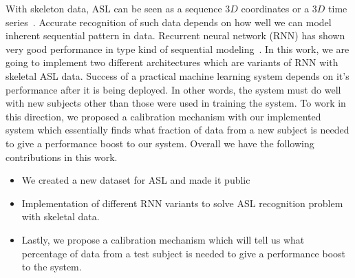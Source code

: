 \documentclass[10pt,twocolumn,letterpaper]{article}
\begin{document}
With skeleton data, ASL can be seen as a sequence $3D$ coordinates or a $3D$ time series~\cite{7298714}. Accurate recognition of such data depends on how well we can model inherent sequential pattern in data. Recurrent neural network (RNN) has shown very good performance in type kind of sequential modeling~\cite{DBLP:journals/corr/Lipton15}. In this work, we are going to implement two different architectures which are variants of RNN with skeletal ASL data. Success of a practical machine learning system depends on it's performance after it is being deployed. In other words, the system must do well with new subjects other than those were used in training the system. To work in this direction, we proposed a calibration mechanism with our implemented system which essentially finds what fraction of data from a new subject is needed to give a performance boost to our system. Overall we have the following contributions in this work.
\begin{itemize}  
	\item We created a new dataset for ASL and made it public
	\item Implementation of different RNN variants to solve ASL recognition problem with skeletal data.
	\item Lastly, we propose a calibration mechanism which will tell us what percentage of data from a test subject is needed to give a performance boost to the system.
\end{itemize}
\end{document}
